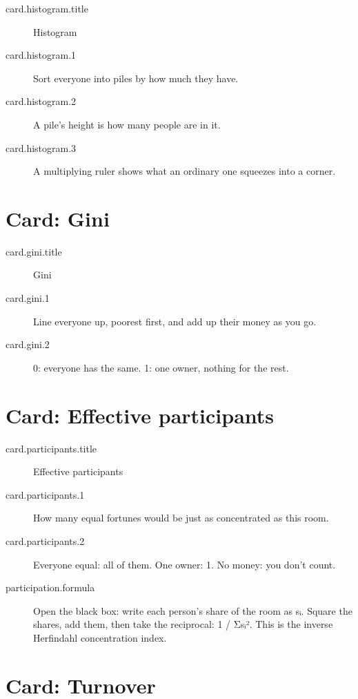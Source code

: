 \begin{description}
  \item[card.histogram.title] Histogram
  \item[card.histogram.1] Sort everyone into piles by how much they have.
  \item[card.histogram.2] A pile's height is how many people are in it.
  \item[card.histogram.3] A multiplying ruler shows what an ordinary one squeezes into a corner.
\end{description}

\section{Card: Gini}\label{card:gini}

\begin{description}
  \item[card.gini.title] Gini
  \item[card.gini.1] Line everyone up, poorest first, and add up their money as you go.
  \item[card.gini.2] 0: everyone has the same. 1: one owner, nothing for the rest.
\end{description}

\section{Card: Effective participants}\label{card:participants}

\begin{description}
  \item[card.participants.title] Effective participants
  \item[card.participants.1] How many equal fortunes would be just as concentrated as this room.
  \item[card.participants.2] Everyone equal: all of them. One owner: 1. No money: you don't count.
  \item[participation.formula] Open the black box: write each person's share of the room as sᵢ. Square the shares, add them, then take the reciprocal: 1 / Σsᵢ². This is the inverse Herfindahl concentration index.
\end{description}


\section{Card: Turnover}\label{card:turnover}

